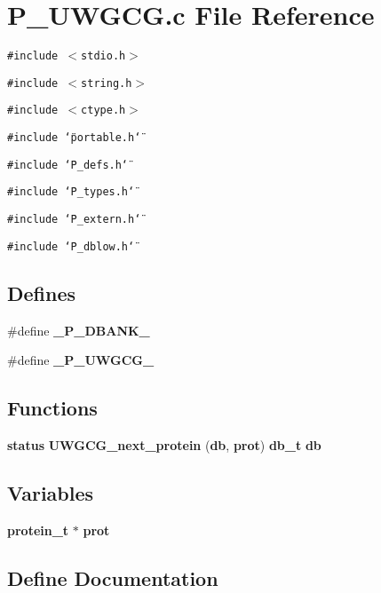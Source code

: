 \section{P\_\-UWGCG.c File Reference}
\label{P__UWGCG_8c}
{\tt \#include $<$stdio.h$>$}\par
{\tt \#include $<$string.h$>$}\par
{\tt \#include $<$ctype.h$>$}\par
{\tt \#include \char`\"{}portable.h\char`\"{}}\par
{\tt \#include \char`\"{}P\_\-defs.h\char`\"{}}\par
{\tt \#include \char`\"{}P\_\-types.h\char`\"{}}\par
{\tt \#include \char`\"{}P\_\-extern.h\char`\"{}}\par
{\tt \#include \char`\"{}P\_\-dblow.h\char`\"{}}\par
\subsection*{Defines}
\begin{CompactItemize}
\item 
\#define {\bf \_\-P\_\-DBANK\_\-}
\item 
\#define {\bf \_\-P\_\-UWGCG\_\-}
\end{CompactItemize}
\subsection*{Functions}
\begin{CompactItemize}
\item 
{\bf status} {\bf UWGCG\_\-next\_\-protein} ({\bf db}, {\bf prot}) {\bf db\_\-t} {\bf db}
\end{CompactItemize}
\subsection*{Variables}
\begin{CompactItemize}
\item 
{\bf protein\_\-t} $\ast$ {\bf prot}
\end{CompactItemize}


\subsection{Define Documentation}
